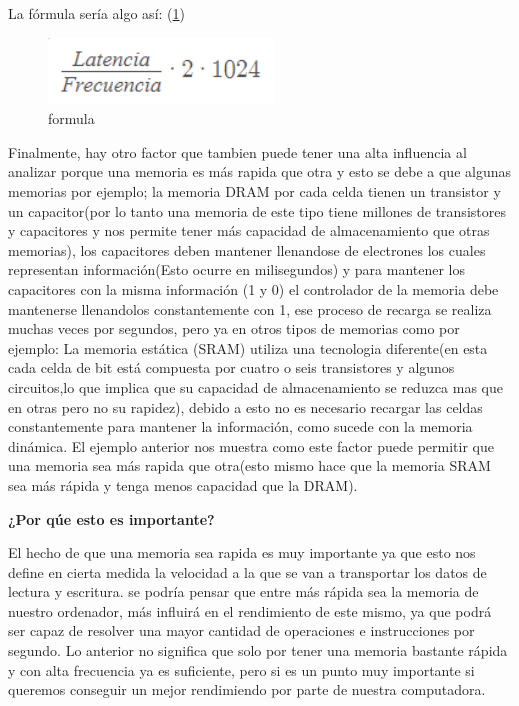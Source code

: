 \documentclass{article}
\begin{document}
La fórmula sería algo así: (\ref{fig:formula})
\begin{figure}[h]
\includegraphics[width=6cm]{formula.PNG}
\centering
\caption{formula}
\label{fig:formula}
\end{figure}

\noindent
Finalmente, hay otro factor que tambien puede tener una alta influencia al analizar porque una memoria es más rapida que otra y esto se debe a que algunas memorias por ejemplo; la memoria DRAM por cada celda tienen un transistor y un capacitor(por lo tanto una memoria de este tipo tiene millones de transistores y capacitores y nos permite tener más capacidad de almacenamiento que otras memorias), los capacitores deben mantener llenandose de electrones los cuales representan información(Esto ocurre en milisegundos) y para mantener los capacitores con la misma información (1 y 0) el controlador de la memoria debe mantenerse llenandolos constantemente con 1, ese proceso de recarga se realiza muchas veces por segundos, pero ya en otros tipos de memorias como por ejemplo: La memoria estática (SRAM) utiliza una tecnologia diferente(en esta cada celda de bit está compuesta por cuatro o seis transistores y algunos circuitos,lo que implica que su capacidad de almacenamiento se reduzca mas que en otras pero no su rapidez), debido a esto no es necesario recargar las celdas constantemente para mantener la información, como sucede con la memoria dinámica. El ejemplo anterior nos muestra como este factor puede permitir que una memoria sea más rapida que otra(esto mismo hace que la memoria SRAM sea más rápida y tenga menos capacidad que la DRAM).\cite{Augusto}

\vspace{0.3cm}
\noindent
\textbf{¿Por qúe esto es importante?}

\vspace{}
\noindent
El hecho de que una memoria sea rapida es muy importante ya que esto nos define en cierta medida la velocidad a la que se van a transportar los datos de lectura y escritura. se podría pensar que entre más rápida sea la memoria de nuestro ordenador, más influirá en el rendimiento de este mismo, ya que podrá ser capaz de resolver una mayor cantidad de operaciones e instrucciones por segundo.
\noindent
Lo anterior no significa que solo por tener una memoria bastante rápida y con alta frecuencia ya es suficiente, pero si es un punto muy importante si queremos conseguir un mejor rendimiendo por parte de nuestra computadora. \cite{computerhoy}
\end{document}
